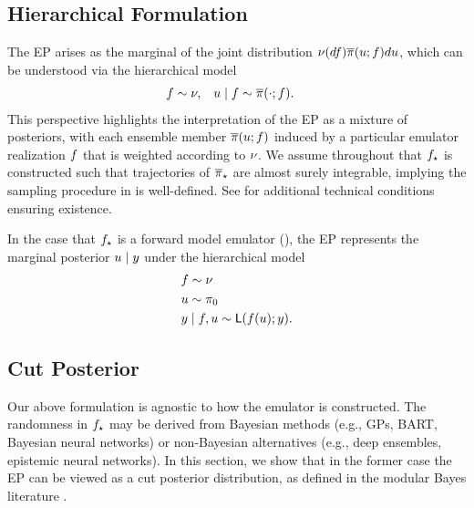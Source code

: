 \documentclass[12pt]{article}
\begin{document}
\subsection{Hierarchical Formulation}
The EP arises as the marginal of the 
joint distribution $\nu(df) \overline{\pi}(u; f) du$, which 
can be understood via the hierarchical model 
\begin{align}
&f  \sim \nu, 
&&u \mid f \sim \overline{\pi}(\cdot; f).
\label{eq:ep-prob-model}
\end{align}
This perspective highlights the interpretation of the EP as a mixture of posteriors,
with each ensemble member $\overline{\pi}(u; f)$ induced by 
a particular emulator realization $f$ that is weighted according to $\nu$.
We assume throughout that ${f}_{\star}$ is constructed such that 
trajectories of ${\overline{\pi}}_{\star}$ are almost surely integrable, implying the sampling procedure
in  is well-defined. See 
\citet{StuartTeck1,StuartTeck2,random_fwd_models,garegnani2021NoisyMCMC} for additional
technical conditions ensuring existence.

In the case that ${f}_{\star}$ is a forward model emulator (), the EP 
represents the marginal posterior $u \mid y$ under the hierarchical model 
\begin{align*}
&f  \sim \nu \\
&u \sim \pi_0 \\
&y \mid f, u \sim \mathsf{L}(f(u); y).
\label{eq:ep-prob-model-fwd}
\end{align*}

\subsection{Cut Posterior} \label{sec:cut}
Our above formulation is agnostic to how the emulator is constructed. The 
randomness in ${f}_{\star}$ may be derived from Bayesian methods 
(e.g., GPs, BART, Bayesian neural networks) or non-Bayesian alternatives
(e.g., deep ensembles, epistemic neural networks). In this section, we show 
that in the former case the EP can be viewed as a cut posterior distribution,
as defined in the modular Bayes literature 
\citep{PlummerCut,cutInference,moduleModels,cutVar,cutVar2}.
\end{document}
